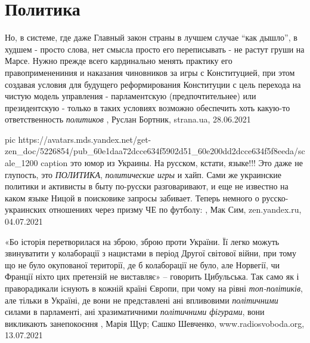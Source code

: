  
 
 
 
 
\chapter{Политика}
\label{sec:slova.politika}

Но, в системе, где даже Главный закон страны в лучшем случае \enquote{как дышло}, в
худшем - просто слова, нет смысла просто его переписывать - не растут груши на
Марсе. Нужно прежде всего кардинально менять практику его правоприменениния и
наказания чиновников за игры с Конституцией, при этом создавая условия для
будущего реформирования Конституции с цель перехода на чистую модель управления
- парламентскую (предпочтительнее) или президентскую - только в таких условиях
возможно обеспечить хоть какую-то ответственность \emph{политиков}
, 
Руслан Бортник, strana.ua, 28.06.2021

\ifcmt
  pic https://avatars.mds.yandex.net/get-zen_doc/5226854/pub_60e1daa72dcce634f5902d51_60e200dd2dcce634f5f8eeda/scale_1200
  caption это юмор из Украины. На русском, кстати, языке!!!
\fi
Это даже не глупость, это \emph{ПОЛИТИКА}, \emph{политические игры} и хайп.
Сами же украинские политики и активисты в быту по-русски разговаривают, и еще
не известно на каком языке Ницой в поисковике запросы забивает.
Теперь немного о русско-украинских отношениях через призму ЧЕ по футболу:
, Мак Сим,
zen.yandex.ru, 04.07.2021

«Бо історія перетворилася на зброю, зброю проти України. Її легко можуть
звинуватити у колаборації з нацистами в період Другої світової війни, при тому
що не було окупованої території, де б колаборації не було, але Норвегії, чи
Франції ніхто цих претензій не виставляє» – говорить Цибульська.
Так само як і праворадикали існують в кожній країні Європи, при чому на рівні
\emph{топ-політиків}, але тільки в Україні, де вони не представлені ані впливовими
\emph{політичними} силами в парламенті, ані хразиматичними \emph{політичними фігурами}, вони
викликають занепокоєння
, 
Марія Щур; Сашко Шевченко, www.radiosvoboda.org, 13.07.2021

